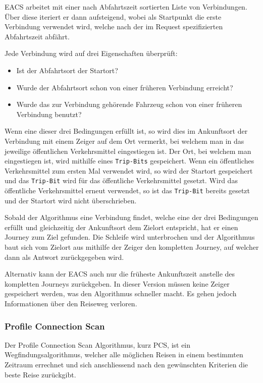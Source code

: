 EACS arbeitet mit einer nach Abfahrtszeit sortierten Liste von Verbindungen. Über diese iteriert er dann aufsteigend, wobei als Startpunkt die erste Verbindung verwendet wird, welche nach der im Request spezifizierten Abfahrtszeit abfährt. \newline

Jede Verbindung wird auf drei Eigenschaften überprüft:
\begin{itemize}
	\item Ist der Abfahrtsort der Startort?
	\item Wurde der Abfahrtsort schon von einer früheren Verbindung erreicht?
	\item Wurde das zur Verbindung gehörende Fahrzeug schon von einer früheren Verbindung benutzt?
\end{itemize}

Wenn eine dieser drei Bedingungen erfüllt ist, so wird dies im Ankunftsort der Verbindung mit einem Zeiger auf dem Ort vermerkt, bei welchem man in das jeweilige öffentlichen Verkehrsmittel eingestiegen ist. Der Ort, bei welchem man eingestiegen ist, wird mithilfe eines \texttt{Trip-Bits} gespeichert. Wenn ein öffentliches Verkehrsmittel zum ersten Mal verwendet wird, so wird der Startort gespeichert und das \texttt{Trip-Bit} wird für das öffentliche Verkehrsmittel gesetzt. Wird das öffentliche Verkehrsmittel erneut verwendet, so ist das \texttt{Trip-Bit} bereits gesetzt und der Startort wird nicht überschrieben. \newline

Sobald der Algorithmus eine Verbindung findet, welche eine der drei Bedingungen erfüllt und gleichzeitig der Ankunftsort dem Zielort entspricht, hat er einen Journey zum Ziel gefunden. Die Schleife wird unterbrochen und der Algorithmus baut sich vom Zielort aus mithilfe der Zeiger den kompletten Journey, auf welcher dann als Antwort zurückgegeben wird. \newline

Alternativ kann der EACS auch nur die früheste Ankunftszeit anstelle des kompletten Journeys zurückgeben. In dieser Version müssen keine Zeiger gespeichert werden, was den Algorithmus schneller macht. Es gehen jedoch Informationen über den Reiseweg verloren.

\subsubsection{Profile Connection Scan}
Der \hypertarget{PCS}{Profile Connection Scan Algorithmus}\cite{csa}, kurz PCS, ist ein Wegfindungsalgorithmus, welcher alle möglichen Reisen in einem bestimmten Zeitraum errechnet und sich anschliessend nach den gewünschten Kriterien die  beste Reise zurückgibt. \newline

